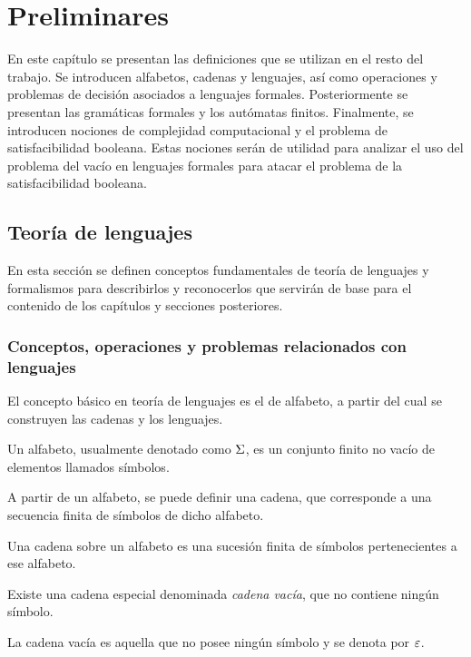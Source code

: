 \chapter{Preliminares}
\label{ch:preliminares}

En este capítulo se presentan las definiciones que se utilizan en el resto del trabajo. Se introducen alfabetos, cadenas y lenguajes, así como operaciones y problemas de decisión asociados a lenguajes formales. Posteriormente se presentan las gramáticas formales y los autómatas finitos. Finalmente, se introducen nociones de complejidad computacional y el problema de satisfacibilidad booleana. Estas nociones serán de utilidad para analizar el uso del problema del vacío en lenguajes formales para atacar el problema de la satisfacibilidad booleana.

\section{Teoría de lenguajes}
\label{sec:languages}

En esta sección se definen conceptos fundamentales de teoría de lenguajes y formalismos para describirlos y reconocerlos que servirán de base para el contenido de los capítulos y secciones posteriores.

\subsection{Conceptos, operaciones y problemas relacionados con lenguajes}

El concepto básico en teoría de lenguajes es el de alfabeto, a partir del cual se construyen las cadenas y los lenguajes.

\begin{definition}
	Un alfabeto, usualmente denotado como $\Sigma$, es un conjunto finito no vacío de elementos llamados símbolos.
\end{definition}

A partir de un alfabeto, se puede definir una cadena, que corresponde a una secuencia finita de símbolos de dicho alfabeto.

\begin{definition}
	Una cadena sobre un alfabeto es una sucesión finita de símbolos pertenecientes a ese alfabeto.
\end{definition}

Existe una cadena especial denominada \emph{cadena vacía}, que no contiene ningún símbolo.

\begin{definition}
	La cadena vacía es aquella que no posee ningún símbolo y se denota por $\varepsilon$.
\end{definition}

